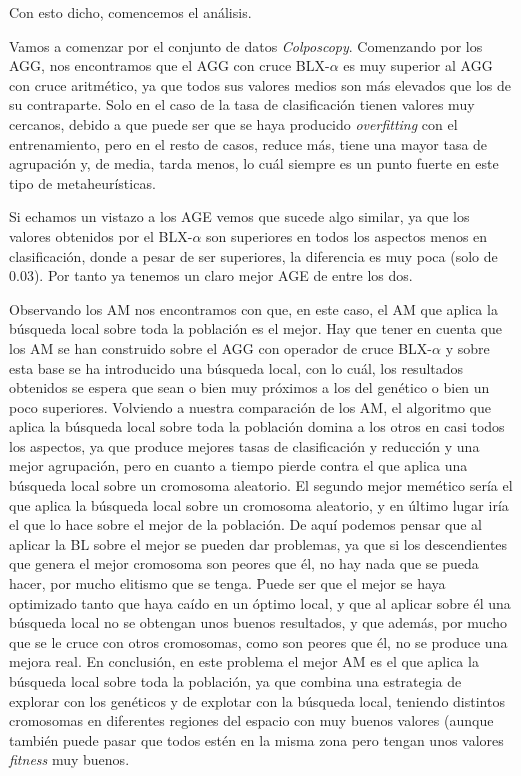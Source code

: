 \documentclass[11pt,a4paper]{article}
\begin{document}
Con esto dicho, comencemos el análisis.

Vamos a comenzar por el conjunto de datos \textit{Colposcopy}. Comenzando por los AGG, nos encontramos que el AGG con cruce
BLX-$\alpha$ es muy superior al AGG con cruce aritmético, ya que todos sus valores medios son más elevados que los de su
contraparte. Solo en el caso de la tasa de clasificación tienen valores muy cercanos, debido a que puede ser que se haya
producido \textit{overfitting} con el entrenamiento, pero en el resto de casos, reduce más, tiene una mayor tasa de agrupación y,
de media, tarda menos, lo cuál siempre es un punto fuerte en este tipo de metaheurísticas.

Si echamos un vistazo a los AGE vemos que sucede algo similar, ya que los valores obtenidos por el BLX-$\alpha$ son superiores
en todos los aspectos menos en clasificación, donde a pesar de ser superiores, la diferencia es muy poca (solo de 0.03). Por tanto
ya tenemos un claro mejor AGE de entre los dos.

Observando los AM nos encontramos con que, en este caso, el AM que aplica la búsqueda local sobre toda la población es el mejor.
Hay que tener en cuenta que los AM se han construido sobre el AGG con operador de cruce BLX-$\alpha$ y sobre esta base se ha
introducido una búsqueda local, con lo cuál, los resultados obtenidos se espera que sean o bien muy próximos a los del genético
o bien un poco superiores. Volviendo a nuestra comparación de los AM, el algoritmo que aplica la búsqueda local sobre toda la
población domina a los otros en casi todos los aspectos, ya que produce mejores tasas de clasificación y reducción y una mejor
agrupación, pero en cuanto a tiempo pierde contra el que aplica una búsqueda local sobre un cromosoma aleatorio. El segundo mejor
memético sería el que aplica la búsqueda local sobre un cromosoma aleatorio, y en último lugar iría el que lo hace sobre el
mejor de la población. De aquí podemos pensar que al aplicar la BL sobre el mejor se pueden dar problemas, ya que si los
descendientes que genera el mejor cromosoma son peores que él, no hay nada que se pueda hacer, por mucho elitismo que se tenga.
Puede ser que el mejor se haya optimizado tanto que haya caído en un óptimo local, y que al aplicar sobre él una búsqueda local no
se obtengan unos buenos resultados, y que además, por mucho que se le cruce con otros cromosomas, como son peores que él, no se
produce una mejora real. En conclusión, en este problema el mejor AM es el que aplica la búsqueda local sobre toda la población,
ya que combina una estrategia de explorar con los genéticos y de explotar con la búsqueda local, teniendo distintos cromosomas
en diferentes regiones del espacio con muy buenos valores (aunque también puede pasar que todos estén en la misma zona pero tengan
unos valores \textit{fitness} muy buenos.
\end{document}
